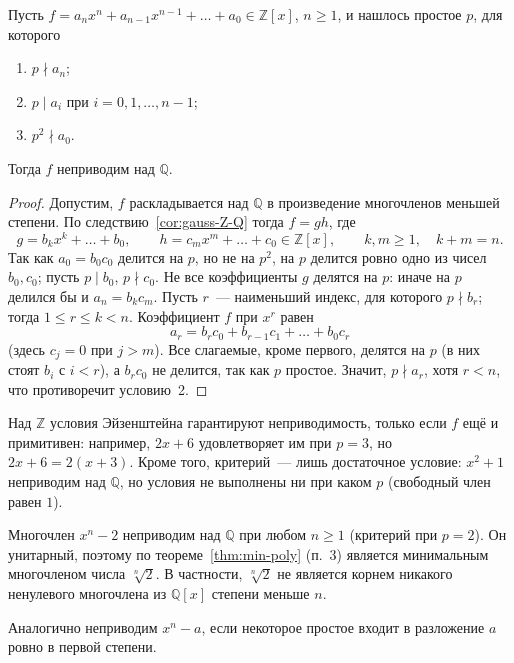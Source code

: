 \documentclass[12pt]{article}
\begin{document}
	\begin{theorem}\label{thm:eisenstein}
		Пусть $f = a_nx^n + a_{n-1}x^{n-1} + \dots + a_0 \in \mathbb{Z}[x]$, $n \geqslant 1$, и нашлось простое $p$, для которого
		\begin{enumerate}
			\item $p \nmid a_n$;
			\item $p \mid a_i$ при $i = 0, 1, \dots, n - 1$;
			\item $p^2 \nmid a_0$.
		\end{enumerate}
		Тогда $f$ неприводим над $\mathbb{Q}$.
	\end{theorem}

	\begin{proof}
		Допустим, $f$ раскладывается над $\mathbb{Q}$ в произведение многочленов меньшей степени. По следствию~\ref{cor:gauss-Z-Q} тогда $f = gh$, где
		\[
			g = b_kx^k + \dots + b_0, \qquad h = c_mx^m + \dots + c_0 \in \mathbb{Z}[x], \qquad k, m \geqslant 1, \quad k + m = n.
		\]
		Так как $a_0 = b_0c_0$ делится на $p$, но не на $p^2$, на $p$ делится ровно одно из чисел $b_0, c_0$; пусть $p \mid b_0$, $p \nmid c_0$. Не все коэффициенты $g$ делятся на $p$: иначе на $p$ делился бы и $a_n = b_kc_m$. Пусть $r$~--- наименьший индекс, для которого $p \nmid b_r$; тогда $1 \leqslant r \leqslant k < n$. Коэффициент $f$ при $x^r$ равен
		\[
			a_r = b_rc_0 + b_{r-1}c_1 + \dots + b_0c_r
		\]
		(здесь $c_j = 0$ при $j > m$). Все слагаемые, кроме первого, делятся на $p$ (в них стоят $b_i$ с $i < r$), а $b_rc_0$ не делится, так как $p$ простое. Значит, $p \nmid a_r$, хотя $r < n$, что противоречит условию~2.
	\end{proof}

	\begin{note}
		Над $\mathbb{Z}$ условия Эйзенштейна гарантируют неприводимость, только если $f$ ещё и примитивен: например, $2x + 6$ удовлетворяет им при $p = 3$, но $2x + 6 = 2(x + 3)$. Кроме того, критерий~--- лишь достаточное условие: $x^2 + 1$ неприводим над $\mathbb{Q}$, но условия не выполнены ни при каком $p$ (свободный член равен $1$).
	\end{note}

	\begin{example}\label{ex:eisenstein-root}
		Многочлен $x^n - 2$ неприводим над $\mathbb{Q}$ при любом $n \geqslant 1$ (критерий при $p = 2$). Он унитарный, поэтому по теореме~\ref{thm:min-poly} (п.~3) является минимальным многочленом числа $\sqrt[n]{2}$. В частности, $\sqrt[n]{2}$ не является корнем никакого ненулевого многочлена из $\mathbb{Q}[x]$ степени меньше $n$.

		Аналогично неприводим $x^n - a$, если некоторое простое входит в разложение $a$ ровно в первой степени.
	\end{example}
\end{document}
